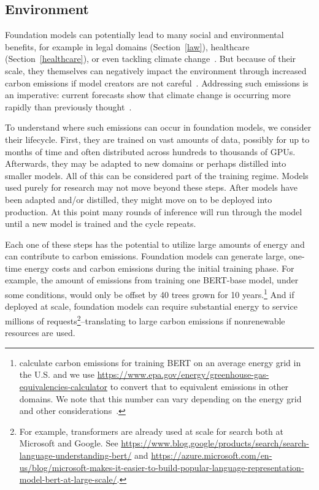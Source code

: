 \newsection
\subsection{Environment}
\label{sec:environment}

Foundation models can potentially lead to many social and environmental benefits, for example in legal domains (Section~\ref{law}), healthcare (Section~\ref{healthcare}), or even tackling climate change~\citep{rolnick2019tackling}. But because of their scale, they themselves can negatively impact the environment through increased carbon emissions if model creators are not careful~\citep{strubell2019energy,lottick2019nergy,schwartz2019green,lacoste2019quantifying,cao2020towards,henderson2020towards,bender2021,patterson2021carbon,lannelongue2021green,parcollet2021energy}. Addressing such emissions is an imperative: current forecasts show that climate change is occurring more rapidly than previously thought~\citep{ipcc2021}.

To understand where such emissions can occur in foundation models, we consider their lifecycle. First, they are trained on vast amounts of data, possibly for up to months of time and often distributed across hundreds to thousands of GPUs. Afterwards, they may be adapted to new domains or perhaps distilled into smaller models. All of this can be considered part of the training regime. Models used purely for research may not move beyond these steps. After models have been adapted and/or distilled, they might move on to be deployed into production. At this point many rounds of inference will run through the model until a new model is trained and the cycle repeats. 

Each one of these steps has the potential to utilize large amounts of energy and can contribute to carbon emissions. Foundation models can generate large, one-time energy costs and carbon emissions during the initial training phase. For example, the amount of emissions from training one BERT-base model, under some conditions, would only be offset by 40 trees grown for 10 years.\footnote{\citet{strubell2019energy} calculate carbon emissions for training BERT on an average energy grid in the U.S. and we use \url{https://www.epa.gov/energy/greenhouse-gas-equivalencies-calculator} to convert that to equivalent emissions in other domains. We note that this number can vary depending on the energy grid and other considerations~\citep{henderson2020towards,patterson2021carbon}.} And if deployed at scale, foundation models can require substantial energy to service millions of requests\footnote{For example, transformers are already used at scale for search both at Microsoft and Google. See \url{https://www.blog.google/products/search/search-language-understanding-bert/} and  \url{https://azure.microsoft.com/en-us/blog/microsoft-makes-it-easier-to-build-popular-language-representation-model-bert-at-large-scale/}.}--translating to large carbon emissions if nonrenewable resources are used.

